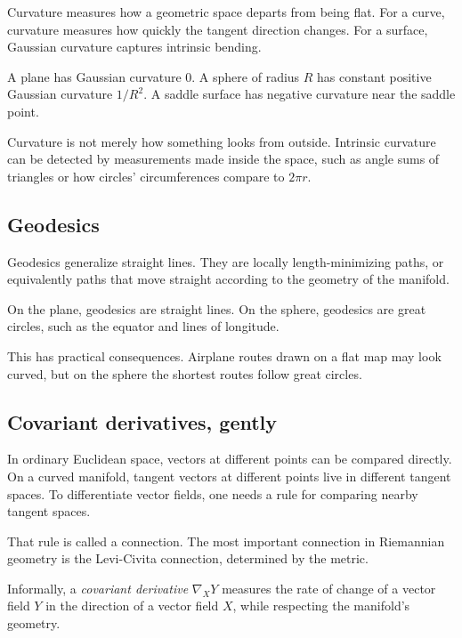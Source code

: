 Curvature measures how a geometric space departs from being flat. For a curve,
curvature measures how quickly the tangent direction changes. For a surface,
Gaussian curvature captures intrinsic bending.

\begin{example}
A plane has Gaussian curvature $0$. A sphere of radius $R$ has constant
positive Gaussian curvature $1/R^2$. A saddle surface has negative curvature
near the saddle point.
\end{example}

\begin{intuitionbox}
Curvature is not merely how something looks from outside. Intrinsic curvature
can be detected by measurements made inside the space, such as angle sums of
triangles or how circles' circumferences compare to $2\pi r$.
\end{intuitionbox}

\subsection{Geodesics}

Geodesics generalize straight lines. They are locally length-minimizing paths,
or equivalently paths that move straight according to the geometry of the
manifold.

\begin{example}
On the plane, geodesics are straight lines. On the sphere, geodesics are great
circles, such as the equator and lines of longitude.
\end{example}

This has practical consequences. Airplane routes drawn on a flat map may look
curved, but on the sphere the shortest routes follow great circles.

\subsection{Covariant derivatives, gently}

In ordinary Euclidean space, vectors at different points can be compared
directly. On a curved manifold, tangent vectors at different points live in
different tangent spaces. To differentiate vector fields, one needs a rule for
comparing nearby tangent spaces.

That rule is called a connection. The most important connection in Riemannian
geometry is the Levi-Civita connection, determined by the metric.

\begin{definition}
Informally, a \emph{covariant derivative} $\nabla_XY$ measures the rate of
change of a vector field $Y$ in the direction of a vector field $X$, while
respecting the manifold's geometry.
\end{definition}

